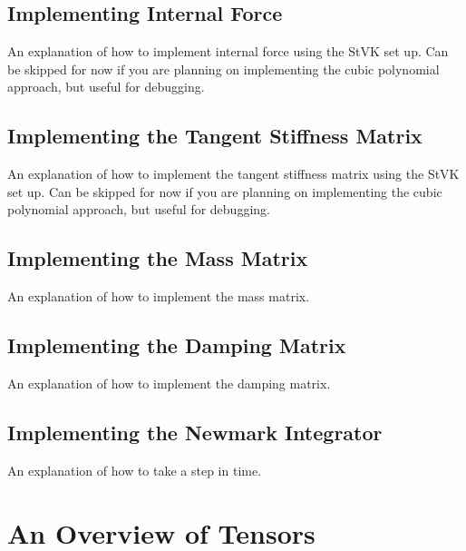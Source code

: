 \documentclass[twocolumn,10pt]{asme2ej}
\begin{document}
\subsection{Implementing Internal Force}

An explanation of how to implement internal force using the StVK set up. Can be skipped for now if you are
planning on implementing the cubic polynomial approach, but useful for debugging.

\subsection{Implementing the Tangent Stiffness Matrix}

An explanation of how to implement the tangent stiffness matrix using the StVK set up. Can be skipped for now if you are
planning on implementing the cubic polynomial approach, but useful for debugging.

\subsection{Implementing the Mass Matrix}

An explanation of how to implement the mass matrix.

\subsection{Implementing the Damping Matrix}

An explanation of how to implement the damping matrix.

\subsection{Implementing the Newmark Integrator}

An explanation of how to take a step in time.

\section{An Overview of Tensors}
\end{document}
